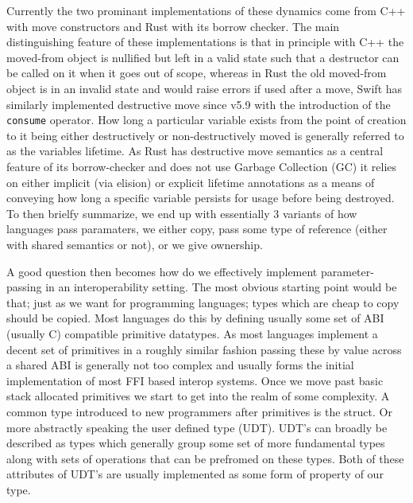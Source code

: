 Currently the two prominant implementations of these dynamics come from C++ with move constructors and Rust with its borrow checker. The main distinguishing feature of these implementations is that in principle with C++ the moved-from object is nullified but left in a valid state such that a destructor can be called on it when it goes out of scope, whereas in Rust the old moved-from object is in an invalid state and would raise errors if used after a move, Swift has similarly implemented destructive move since v5.9 with the introduction of the \texttt{consume} operator. How long a particular variable exists from the point of creation to it being either destructively or non-destructively moved is generally referred to as the variables lifetime. As Rust has destructive move semantics as a central feature of its borrow-checker and does not use Garbage Collection (GC) it relies on either implicit (via elision) or explicit lifetime annotations as a means of conveying how long a specific variable persists for usage before being destroyed. To then brielfy summarize, we end up with essentially 3 variants of how languages pass paramaters, we either copy, pass some type of reference (either with shared semantics or not), or we give ownership. 

A good question then becomes how do we effectively implement parameter-passing in an interoperability setting. The most obvious starting point would be that; just as we want for programming languages; types which are cheap to copy should be copied. Most languages do this by defining usually some set of ABI (usually C) compatible primitive datatypes. As most languages implement a decent set of primitives in a roughly similar fashion passing these by value across a shared ABI is generally not too complex and usually forms the initial implementation of most FFI based interop systems. Once we move past basic stack allocated primitives we start to get into the realm of some complexity. A common type introduced to new programmers after primitives is the struct. Or more abstractly speaking the user defined type (UDT). UDT's can broadly be described as types which generally group some set of more fundamental types along with sets of operations that can be prefromed on these types. Both of these attributes of UDT's are usually implemented as some form of property of our type. 


